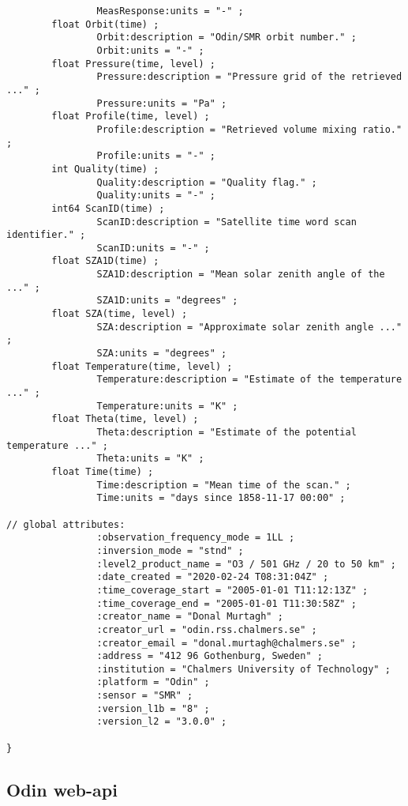 \begin{verbatim}
                MeasResponse:units = "-" ;
        float Orbit(time) ;
                Orbit:description = "Odin/SMR orbit number." ;
                Orbit:units = "-" ;
        float Pressure(time, level) ;
                Pressure:description = "Pressure grid of the retrieved ..." ;
                Pressure:units = "Pa" ;
        float Profile(time, level) ;
                Profile:description = "Retrieved volume mixing ratio." ;
                Profile:units = "-" ;
        int Quality(time) ;
                Quality:description = "Quality flag." ;
                Quality:units = "-" ;
        int64 ScanID(time) ;
                ScanID:description = "Satellite time word scan identifier." ;
                ScanID:units = "-" ;
        float SZA1D(time) ;
                SZA1D:description = "Mean solar zenith angle of the ..." ;
                SZA1D:units = "degrees" ;
        float SZA(time, level) ;
                SZA:description = "Approximate solar zenith angle ..." ;
                SZA:units = "degrees" ;
        float Temperature(time, level) ;
                Temperature:description = "Estimate of the temperature ..." ;
                Temperature:units = "K" ;
        float Theta(time, level) ;
                Theta:description = "Estimate of the potential temperature ..." ;
                Theta:units = "K" ;
        float Time(time) ;
                Time:description = "Mean time of the scan." ;
                Time:units = "days since 1858-11-17 00:00" ;

// global attributes:
                :observation_frequency_mode = 1LL ;
                :inversion_mode = "stnd" ;
                :level2_product_name = "O3 / 501 GHz / 20 to 50 km" ;
                :date_created = "2020-02-24 T08:31:04Z" ;
                :time_coverage_start = "2005-01-01 T11:12:13Z" ;
                :time_coverage_end = "2005-01-01 T11:30:58Z" ;
                :creator_name = "Donal Murtagh" ;
                :creator_url = "odin.rss.chalmers.se" ;
                :creator_email = "donal.murtagh@chalmers.se" ;
                :address = "412 96 Gothenburg, Sweden" ;
                :institution = "Chalmers University of Technology" ;
                :platform = "Odin" ;
                :sensor = "SMR" ;
                :version_l1b = "8" ;
                :version_l2 = "3.0.0" ;

}
\end{verbatim}


\subsection{Odin web-api}

